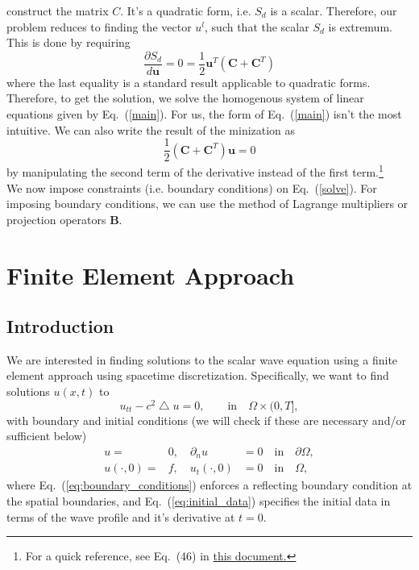 \documentclass[nofootinbib,preprintnumbers,superscriptaddress,notitlepage]{revtex4-1}
\newcommand{\<}{\begin{equation}}
\newcommand{\?}{\end{equation}}
\begin{document}
construct the matrix $C$. It's a quadratic form, i.e. $S_d$ is a scalar.
Therefore, our problem reduces to finding the vector $u^l$, such that the
scalar $S_d$ is extremum. This is done by requiring
\begin{equation}
\label{main}
\dfrac{\partial S_d}{d\mathbf{u}} = 0 = \dfrac{1}{2}\mathbf{u}^T (\mathbf{C} + \mathbf{C}^T)
\end{equation}
where the last equality is a standard result applicable to quadratic forms.
Therefore, to get the solution, we solve the homogenous system of
linear equations given by Eq.~(\ref{main}). For us, the form of Eq.~(\ref{main}) isn't the most
intuitive. We can also write the result of the minization as
\begin{equation}
\label{solve}
\dfrac{1}{2}(\mathbf{C} + \mathbf{C}^T)\mathbf{u} = 0 
\end{equation}
by manipulating the second term of the derivative instead of the
first term.\footnote{For a quick reference, see Eq.~(46) in
\href{http://www.atmos.washington.edu/~dennis/MatrixCalculus.pdf}{this
document.}}\\

We now impose constraints (i.e. boundary conditions) on Eq.~(\ref{solve}). For
imposing boundary conditions, we can use the method of Lagrange multipliers or
projection operators $\mathbf{B}$. 

\appendix
\section{Finite Element Approach}

\subsection{Introduction}

We are interested in finding solutions to the scalar wave equation using a 
finite element approach using spacetime discretization. Specifically, we want
to find solutions $u(x, t)$ to
\begin{equation}
\label{eq:wave_equation}
u_{tt} - c^2 \bigtriangleup u = 0, \qquad \text{in} \quad \Omega \times (0, T],
\end{equation}
with boundary and initial conditions (we will check if these are necessary
and/or sufficient below)
\begin{eqnarray}
\label{eq:boundary_conditions}
u =& 0,\quad \partial_{n} u &= 0 \quad \text{in} \quad \partial\Omega,\\
\label{eq:initial_data}
u(\cdot, 0) =& f,\quad u_t(\cdot, 0) &=  0 \quad \text{in} \quad \Omega,
\end{eqnarray}
where Eq.~(\ref{eq:boundary_conditions}) enforces a reflecting boundary
condition at the spatial boundaries, and Eq.~(\ref{eq:initial_data}) specifies
the initial data in terms of the wave profile and it's derivative at $t=0$.\\
\end{document}
